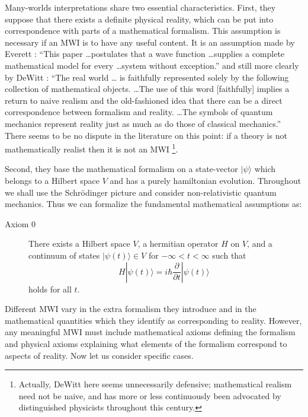 \documentclass[aps,pra,12pt]{revtex4}
\def\ket#1{| #1\rangle}
\begin{document}
Many-worlds interpretations share two essential characteristics.
First, they suppose that there exists a definite physical reality,
which can be put into correspondence with parts of a mathematical
formalism.  This assumption is necessary if an MWI is to have any
useful content. It is an assumption made by Everett \cite{ev}: ``This paper
\ldots postulates that a wave function \ldots supplies a complete
mathematical model for every \ldots system without exception.'' and
still more clearly by DeWitt \cite{dew}: ``The real world \ldots
is faithfully represented solely by the following collection of 
mathematical objects. \ldots The use of this word [faithfully] implies
a return to naive realism and the old-fashioned idea that there can be a 
direct correspondence between formalism and reality. \ldots The symbols
of quantum mechanics represent reality just as much as do those of 
classical mechanics.'' There seems to be no dispute in the literature on this point: if a theory
is not mathematically realist then it is not an MWI  \footnote{Actually, DeWitt here seems 
unnecessarily defensive; mathematical realism need not be naive, and has more 
or less continuously been advocated by distinguished physicists 
throughout this century.}.

Second, they base the mathematical formalism on a state-vector
$\ket{\psi}$ which belongs to a Hilbert space $V$ and has a purely
hamiltonian evolution.  Throughout we shall use the Schr\"{o}dinger
picture and consider non-relativistic quantum mechanics.  Thus we can
formalize the fundamental mathematical assumptions as:
\begin{description}
\item[Axiom $0$]  There exists a Hilbert space $V$, a hermitian operator $H$ on
$V$, and a continuum of states $\ket{ \psi (t) } \in V$ for $-\infty <
t < \infty$ such that
\begin{equation}\label{schrod}
H \ket{ \psi (t) } = i \hbar \frac{ \partial }{\partial t} \ket{ \psi
(t) }~~
\end{equation}
holds for all $t$.
\end{description}

Different MWI vary in the extra formalism they introduce and in the
mathematical quantities which they identify as corresponding to
reality.  However, any meaningful MWI must include mathematical axioms
defining the formalism and physical axioms explaining what elements of
the formalism correspond to aspects of reality.  Now let us consider
specific cases.
\end{document}
